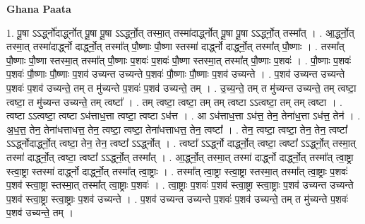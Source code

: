 \documentclass[17pt]{extarticle}
\begin{document}
\textbf{Ghana Paata } \newline

1. पू॒षा ऽऽर्द्ध्नो॑दार्द्ध्नोत् पू॒षा पू॒षा ऽऽर्द्ध्नो॒त् तस्मा॒त् तस्मा॑दार्द्ध्नोत् पू॒षा पू॒षा ऽऽर्द्ध्नो॒त् तस्मा᳚त् । . आ॒र्द्ध्नो॒त् तस्मा॒त् तस्मा॑दार्द्ध्नो दार्द्ध्नो॒त् तस्मा᳚त् पौ॒ष्णाः पौ॒ष्णा स्तस्मा॑ दार्द्ध्नो दार्द्ध्नो॒त् तस्मा᳚त् पौ॒ष्णाः । . तस्मा᳚त् पौ॒ष्णाः पौ॒ष्णा स्तस्मा॒त् तस्मा᳚त् पौ॒ष्णाः प॒शवः॑ प॒शवः॑ पौ॒ष्णा स्तस्मा॒त् तस्मा᳚त् पौ॒ष्णाः प॒शवः॑ । . पौ॒ष्णाः प॒शवः॑ प॒शवः॑ पौ॒ष्णाः पौ॒ष्णाः प॒शव॑ उच्यन्त उच्यन्ते प॒शवः॑ पौ॒ष्णाः पौ॒ष्णाः प॒शव॑ उच्यन्ते । . प॒शव॑ उच्यन्त उच्यन्ते प॒शवः॑ प॒शव॑ उच्यन्ते॒ तम् त मु॑च्यन्ते प॒शवः॑ प॒शव॑ उच्यन्ते॒ तम् । . उ॒च्य॒न्ते॒ तम् त मु॑च्यन्त उच्यन्ते॒ तम् त्वष्टा॒ त्वष्टा॒ त मु॑च्यन्त उच्यन्ते॒ तम् त्वष्टा᳚ । . तम् त्वष्टा॒ त्वष्टा॒ तम् तम् त्वष्टा ऽऽत्वष्टा॒ तम् तम् त्वष्टा । . त्वष्टा ऽऽत्वष्टा॒ त्वष्टा ऽध॑त्ताध॒त्ता त्वष्टा॒ त्वष्टा ऽध॑त्त । . आ ऽध॑त्ताध॒त्ता ऽध॑त्त॒ तेन॒ तेना॑ध॒त्ता ऽध॑त्त॒ तेन॑ । . अ॒ध॒त्त॒ तेन॒ तेना॑धत्ताधत्त॒ तेन॒ त्वष्टा॒ त्वष्टा॒ तेना॑धत्ताधत्त॒ तेन॒ त्वष्टा᳚ । . तेन॒ त्वष्टा॒ त्वष्टा॒ तेन॒ तेन॒ त्वष्टा᳚ ऽऽर्द्ध्नोदार्द्ध्नो॒त् त्वष्टा॒ तेन॒ तेन॒ त्वष्टा᳚ ऽऽर्द्ध्नोत् । . त्वष्टा᳚ ऽऽर्द्ध्नो दार्द्ध्नो॒त् त्वष्टा॒ त्वष्टा᳚ ऽऽर्द्ध्नो॒त् तस्मा॒त् तस्मा॑ दार्द्ध्नो॒त् त्वष्टा॒ त्वष्टा᳚ ऽऽर्द्ध्नो॒त् तस्मा᳚त् । . आ॒र्द्ध्नो॒त् तस्मा॒त् तस्मा॑ दार्द्ध्नो दार्द्ध्नो॒त् तस्मा᳚त् त्वा॒ष्ट्रा स्त्वा॒ष्ट्रा स्तस्मा॑ दार्द्ध्नो दार्द्ध्नो॒त् तस्मा᳚त् त्वा॒ष्ट्राः । . तस्मा᳚त् त्वा॒ष्ट्रा स्त्वा॒ष्ट्रा स्तस्मा॒त् तस्मा᳚त् त्वा॒ष्ट्राः प॒शवः॑ प॒शव॑ स्त्वा॒ष्ट्रा स्तस्मा॒त् तस्मा᳚त् त्वा॒ष्ट्राः प॒शवः॑ । . त्वा॒ष्ट्राः प॒शवः॑ प॒शव॑ स्त्वा॒ष्ट्रा स्त्वा॒ष्ट्राः प॒शव॑ उच्यन्त उच्यन्ते प॒शव॑ स्त्वा॒ष्ट्रा स्त्वा॒ष्ट्राः प॒शव॑ उच्यन्ते । . प॒शव॑ उच्यन्त उच्यन्ते प॒शवः॑ प॒शव॑ उच्यन्ते॒ तम् त मु॑च्यन्ते प॒शवः॑ प॒शव॑ उच्यन्ते॒ तम् । \newline
\end{document}
